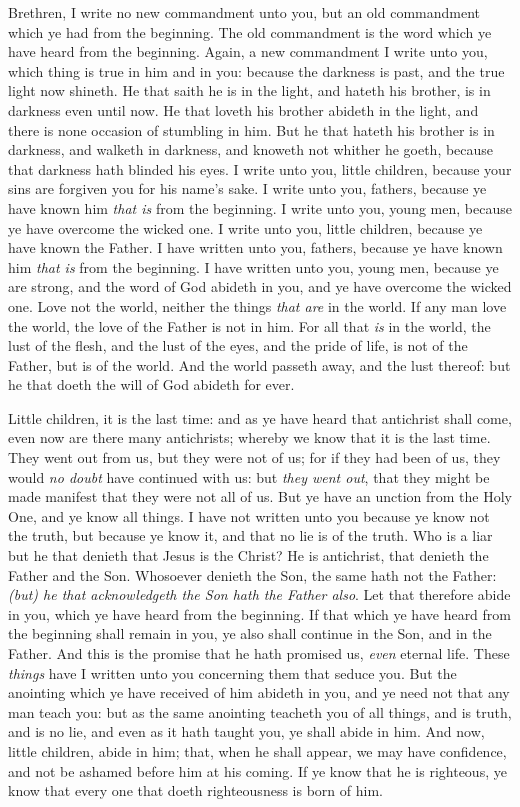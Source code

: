 \documentclass[11pt,letterpaper,oneside]{memoir}
\begin{document}
Brethren, I write no new commandment unto you, but an old commandment
which ye had from the beginning. The old commandment is the word which
ye have heard from the beginning.  Again, a new commandment I write
unto you, which thing is true in him and in you: because the darkness
is past, and the true light now shineth.  He that saith he is in the
light, and hateth his brother, is in darkness even until now.  He that
loveth his brother abideth in the light, and there is none occasion of
stumbling in him.  But he that hateth his brother is in darkness, and
walketh in darkness, and knoweth not whither he goeth, because that
darkness hath blinded his eyes.  I write unto you, little children,
because your sins are forgiven you for his name's sake.  I write unto
you, fathers, because ye have known him \emph{that is} from the
beginning. I write unto you, young men, because ye have overcome the
wicked one. I write unto you, little children, because ye have known
the Father.  I have written unto you, fathers, because ye have known
him \emph{that is} from the beginning. I have written unto you, young
men, because ye are strong, and the word of God abideth in you, and ye
have overcome the wicked one.  Love not the world, neither the things
\emph{that are} in the world. If any man love the world, the love of
the Father is not in him.  For all that \emph{is} in the world, the
lust of the flesh, and the lust of the eyes, and the pride of life, is
not of the Father, but is of the world.  And the world passeth away,
and the lust thereof: but he that doeth the will of God abideth for
ever.

Little children, it is the last time: and as ye have heard that
antichrist shall come, even now are there many antichrists; whereby we
know that it is the last time.  They went out from us, but they were
not of us; for if they had been of us, they would \emph{no doubt} have
continued with us: but \emph{they went out}, that they might be made
manifest that they were not all of us.  But ye have an unction from
the Holy One, and ye know all things.  I have not written unto you
because ye know not the truth, but because ye know it, and that no lie
is of the truth.  Who is a liar but he that denieth that Jesus is the
Christ? He is antichrist, that denieth the Father and the Son.
Whosoever denieth the Son, the same hath not the Father: \emph{(but)
he that acknowledgeth the Son hath the Father also}.  Let that
therefore abide in you, which ye have heard from the beginning. If
that which ye have heard from the beginning shall remain in you, ye
also shall continue in the Son, and in the Father.  And this is the
promise that he hath promised us, \emph{even} eternal life.  These
\emph{things} have I written unto you concerning them that seduce you.
But the anointing which ye have received of him abideth in you, and ye
need not that any man teach you: but as the same anointing teacheth
you of all things, and is truth, and is no lie, and even as it hath
taught you, ye shall abide in him.  And now, little children, abide in
him; that, when he shall appear, we may have confidence, and not be
ashamed before him at his coming.  If ye know that he is righteous, ye
know that every one that doeth righteousness is born of him.
\end{document}
